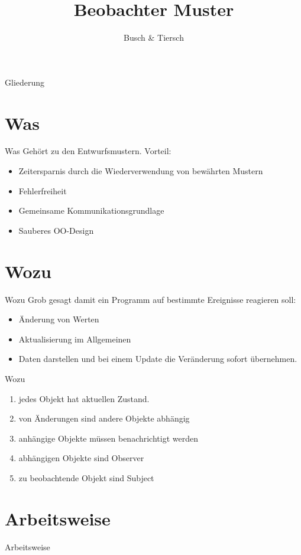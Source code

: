 \documentclass[12pt]{beamer}
\author{Busch \& Tiersch}
\title{Beobachter Muster}
\begin{document}
\begin{frame}
\titlepage
\end{frame}

\begin{frame}{Gliederung}
\tableofcontents
\end{frame}
\section{Was}
\begin{frame}{Was}
  Gehört zu den Entwurfsmustern.
  Vorteil:
  \begin{itemize}
  \item Zeitersparnis durch die Wiederverwendung von bewährten Mustern
  \item Fehlerfreiheit
  \item Gemeinsame Kommunikationsgrundlage
  \item Sauberes OO-Design
  \end{itemize}    
\end{frame}
\section{Wozu}
\begin{frame}{Wozu}
  Grob gesagt damit ein Programm auf bestimmte Ereignisse reagieren soll:
  \begin{itemize}
    \item Änderung von Werten
    \item Aktualisierung im Allgemeinen
    \item Daten darstellen und bei einem Update die Veränderung sofort übernehmen.
  \end{itemize}
\end{frame}
\begin{frame}{Wozu}
  \begin{enumerate}
    \item jedes Objekt hat aktuellen Zustand.
    \item von Änderungen sind andere Objekte abhängig 
    \item anhängige Objekte müssen benachrichtigt werden
    \item abhängigen Objekte sind Observer
    \item zu beobachtende Objekt sind Subject
  \end{enumerate}
\end{frame}
\section{Arbeitsweise}
\begin{frame}{Arbeitsweise}

\end{frame}
\end{document}
